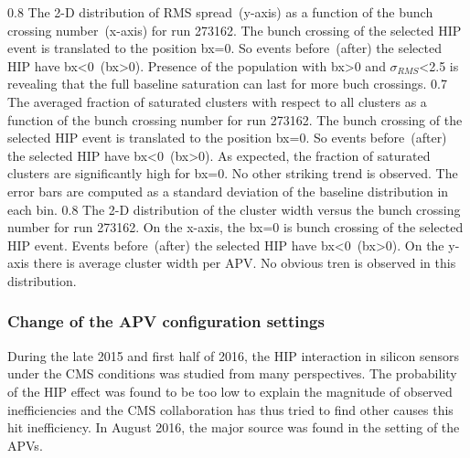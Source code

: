                  {0.8}       %
                 {The 2-D distribution of RMS spread~(y-axis) as a function of the bunch crossing number~(x-axis) for run 273162. The bunch crossing of the selected HIP event is translated to the position bx=0. So events before~(after) the selected HIP have bx<0~(bx>0). Presence of the population with bx>0 and $\sigma_{RMS}$<2.5 is revealing that the full baseline saturation can last for more buch crossings. } %
                 {0.7}       %
                 {The averaged fraction of saturated clusters with respect to all clusters as a function of the bunch crossing  number for run 273162. The bunch crossing of the selected HIP event is translated to the position bx=0. So events before~(after) the selected HIP have bx<0~(bx>0). As expected, the fraction of saturated clusters are significantly high for bx=0. No other striking trend is observed. The error bars are computed as a standard deviation of the baseline distribution in each bin. } %
                 {0.8}       %
                 {The 2-D distribution of the cluster width versus the bunch crossing number for run 273162. On the x-axis, the bx=0 is bunch crossing of the selected HIP event. Events before~(after) the selected HIP have bx<0~(bx>0). On the y-axis there is average cluster width per APV. No obvious tren is observed in this distribution. } %


\subsubsection{Change of the APV configuration settings}

During the late 2015 and first half of 2016, the HIP interaction in silicon sensors under the CMS conditions was studied from many perspectives. The probability of the HIP effect was found to be too low to explain the magnitude of observed inefficiencies and the CMS collaboration has thus tried to find other causes this hit inefficiency. In August 2016, the major source was found in the setting of the APVs.

